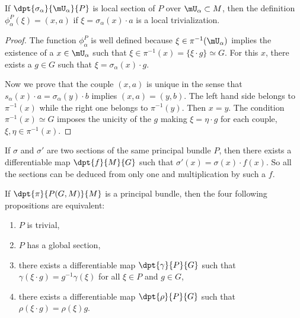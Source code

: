 \begin{proposition}
	If $\dpt{\sigma_{\alpha}}{\mU_{\alpha}}{P}$ is local section of $P$ over $\mU_{\alpha}\subset M$, then the definition $\phi_{\alpha}^P(\xi)=(x,a)$ if $\xi=\sigma_{\alpha}(x)\cdot a$ is a local trivialization.
\end{proposition}

\begin{proof}
	The function $\phi_{\alpha}^P$ is well defined because $\xi\in\pi^{-1}(\mU_{\alpha})$ implies the existence of a $x\in\mU_{\alpha}$ such that $\xi\in\pi^{-1}(x)=\{\xi\cdot g\}\simeq G$. For this $x$, there exists a $g\in G$ such that $\xi=\sigma_{\alpha}(x)\cdot g$.

	Now we prove that the couple $(x,a)$ is unique in the sense that $s_{\alpha}(x)\cdot a=\sigma_{\alpha}(y)\cdot b$ implies $(x,a)=(y,b)$. The left hand side belongs to $\pi^{-1}(x)$ while the right one belongs to $\pi^{-1}(y)$. Then $x=y$. The condition $\pi^{-1}(x)\simeq G$ imposes the unicity of the $g$ making $\xi=\eta\cdot g$ for each couple, $\xi,\eta\in\pi^{-1}(x)$.
\end{proof}

If $\sigma$ and $\sigma'$ are two sections of the same principal bundle $P$, then there exists a differentiable map $\dpt{f}{M}{G}$ such that $\sigma'(x)=\sigma(x)\cdot f(x)$. So all the sections can be deduced from only one and multiplication by such a $f$.

\begin{theorem}
	If $\dpt{\pi}{P(G,M)}{M}$ is a principal bundle, then the four following propositions are equivalent:
	\begin{enumerate}
		\item\label{enuymai} $P$ is trivial,
		\item\label{enuymaii} $P$ has a global section,
		\item\label{enuymaiii} there exists a differentiable map $\dpt{\gamma}{P}{G}$ such that $\gamma(\xi\cdot g)=g^{-1}\gamma(\xi)$ for all $\xi\in P$ and $g\in G$,
		\item\label{enuymaiv} there exists a differentiable map $\dpt{\rho}{P}{G}$ such that $\rho(\xi\cdot g)=\rho(\xi)g$.
	\end{enumerate}
	\label{ThoYPrincBTrivSect}
\end{theorem}

